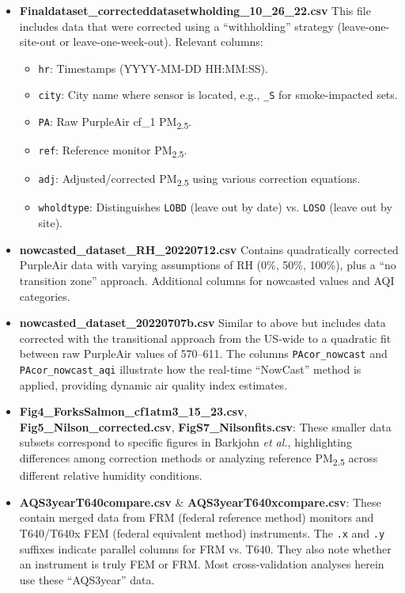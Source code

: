 \documentclass[12pt]{article}                                %
\begin{document}
\begin{itemize}
\item \textbf{Finaldataset\_correcteddatasetwholding\_10\_26\_22.csv}  
      This file includes data that were corrected using a “withholding” strategy (leave-one-site-out 
      or leave-one-week-out). Relevant columns:
      \begin{itemize}
         \item \texttt{hr}: Timestamps (YYYY-MM-DD HH:MM:SS).
         \item \texttt{city}: City name where sensor is located, e.g., \texttt{\_S} for smoke-impacted sets.
         \item \texttt{PA}: Raw PurpleAir cf\_1 PM\textsubscript{2.5}.
         \item \texttt{ref}: Reference monitor PM\textsubscript{2.5}.
         \item \texttt{adj}: Adjusted/corrected PM\textsubscript{2.5} using various correction equations.
         \item \texttt{wholdtype}: Distinguishes \texttt{LOBD} (leave out by date) vs. \texttt{LOSO} (leave out by site).
      \end{itemize}

\item \textbf{nowcasted\_dataset\_RH\_20220712.csv}  
    Contains quadratically corrected PurpleAir data with varying assumptions of RH (0\%, 50\%, 100\%), 
    plus a “no transition zone” approach. Additional columns for nowcasted values and AQI categories.

\item \textbf{nowcasted\_dataset\_20220707b.csv}  
    Similar to above but includes data corrected with the transitional approach from the US-wide 
    to a quadratic fit between raw PurpleAir values of 570--611. The columns 
    \texttt{PAcor\_nowcast} and \texttt{PAcor\_nowcast\_aqi} illustrate how the real-time 
    “NowCast” method is applied, providing dynamic air quality index estimates.

\item \textbf{Fig4\_ForksSalmon\_cf1atm3\_15\_23.csv}, \textbf{Fig5\_Nilson\_corrected.csv}, 
    \textbf{FigS7\_Nilsonfits.csv}:  
    These smaller data subsets correspond to specific figures in Barkjohn \emph{et al.}, 
    highlighting differences among correction methods or analyzing reference 
    PM\textsubscript{2.5} across different relative humidity conditions.

\item \textbf{AQS3yearT640compare.csv} \& \textbf{AQS3yearT640xcompare.csv}:  
    These contain merged data from FRM (federal reference method) monitors and T640/T640x FEM 
    (federal equivalent method) instruments. The \texttt{.x} and \texttt{.y} suffixes indicate 
    parallel columns for FRM vs. T640. They also note whether an instrument is truly FEM or FRM. 
    Most cross-validation analyses herein use these “AQS3year” data.
\end{itemize}
\end{document}

